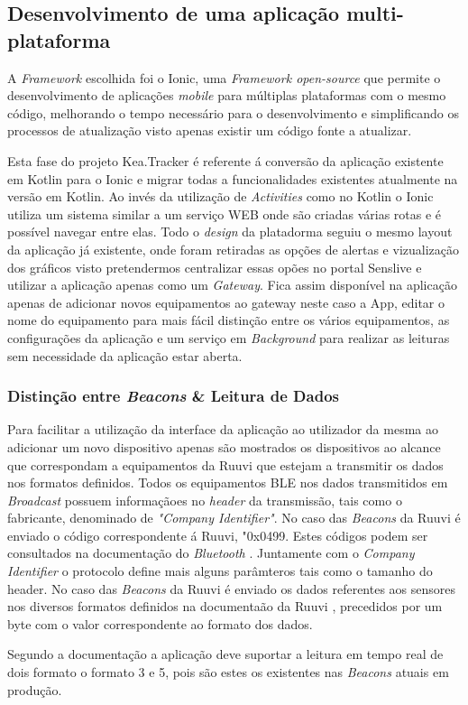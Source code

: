 \subsection{Desenvolvimento de uma aplicação multi-plataforma}

\par A \textit{Framework} escolhida foi o Ionic, uma \textit{Framework open-source} que permite o desenvolvimento de aplicações \textit{mobile} para múltiplas plataformas com o mesmo código, melhorando o tempo necessário para o desenvolvimento e simplificando os processos de atualização visto apenas existir um código fonte a atualizar. 
\par Esta fase do projeto Kea.Tracker é referente á conversão da aplicação existente em Kotlin para o Ionic e migrar todas a funcionalidades existentes atualmente na versão em Kotlin. 
Ao invés da utilização de \textit{Activities} como no Kotlin o Ionic utiliza um sistema similar a um serviço WEB onde são criadas várias rotas e é possível navegar entre elas. Todo o \textit{design} da platadorma seguiu o mesmo layout da aplicação já existente, onde foram retiradas as opções de alertas e vizualização dos gráficos visto pretendermos centralizar essas opões no portal Senslive e utilizar a aplicação apenas como um \textit{Gateway}. Fica assim disponível na aplicação apenas de adicionar novos equipamentos ao gateway neste caso a App, editar o nome do equipamento para mais fácil distinção entre os vários equipamentos, as configurações da aplicação e um serviço em \textit{Background} para realizar as leituras sem necessidade da aplicação estar aberta.
	
\subsubsection{Distinção entre \textit{Beacons} \& Leitura de Dados  }

\par Para facilitar a utilização da interface da aplicação ao utilizador da mesma ao adicionar um novo dispositivo apenas são mostrados os dispositivos ao alcance que correspondam a equipamentos da Ruuvi que estejam a transmitir os dados nos formatos definidos. Todos os equipamentos BLE nos dados transmitidos em \textit{Broadcast} possuem informaçãoes no \textit{header} da transmissão, tais como o fabricante, denominado de \textit{"Company Identifier"}. No caso das \textit{Beacons} da Ruuvi é enviado o código  correspondente á Ruuvi, "0x0499. Estes códigos podem ser consultados na documentação do \textit{Bluetooth} \cite{companySI}. Juntamente com o \textit{Company Identifier} o protocolo define mais alguns parâmteros tais como o tamanho do header. No caso das \textit{Beacons} da Ruuvi é enviado os dados referentes aos sensores nos diversos formatos definidos na documentaão da Ruuvi \cite{GitHubRuuvi}, precedidos por um byte com o valor correspondente  ao formato dos dados.
\par Segundo a documentação a aplicação deve suportar a leitura em tempo real de dois formato o formato 3 e 5, pois são estes os existentes nas \textit{Beacons} atuais em produção.



